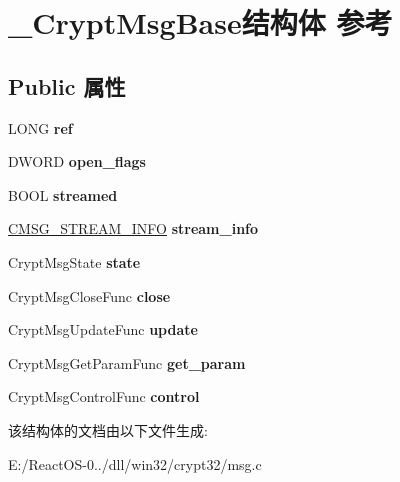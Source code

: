 \hypertarget{struct___crypt_msg_base}{}\section{\+\_\+\+Crypt\+Msg\+Base结构体 参考}
\label{struct___crypt_msg_base}
\subsection*{Public 属性}
\begin{DoxyCompactItemize}
\item 
\mbox{\label{struct___crypt_msg_base_a9ef50b71b8560a07428c10c747a4773d}} 
L\+O\+NG {\bfseries ref}
\item 
\mbox{\label{struct___crypt_msg_base_a504801162ea771fd24d28c3953c7ad0d}} 
D\+W\+O\+RD {\bfseries open\+\_\+flags}
\item 
\mbox{\label{struct___crypt_msg_base_ae7b6eb3c3d86d8cea5c2866d2ce30c54}} 
B\+O\+OL {\bfseries streamed}
\item 
\mbox{\label{struct___crypt_msg_base_a82082addd8fb4af039c94643dbd730a5}} 
\hyperlink{struct___c_m_s_g___s_t_r_e_a_m___i_n_f_o}{C\+M\+S\+G\+\_\+\+S\+T\+R\+E\+A\+M\+\_\+\+I\+N\+FO} {\bfseries stream\+\_\+info}
\item 
\mbox{\label{struct___crypt_msg_base_a71ffa37452ea6b9bc047c78123a5fc26}} 
Crypt\+Msg\+State {\bfseries state}
\item 
\mbox{\label{struct___crypt_msg_base_a94ada17daadbc2bd9564ee931619ccf5}} 
Crypt\+Msg\+Close\+Func {\bfseries close}
\item 
\mbox{\label{struct___crypt_msg_base_aa197c342ba9c04b4b8f5b549ba2fba60}} 
Crypt\+Msg\+Update\+Func {\bfseries update}
\item 
\mbox{\label{struct___crypt_msg_base_a6caa29d3a5c0c1095b5fcd6c3861ae76}} 
Crypt\+Msg\+Get\+Param\+Func {\bfseries get\+\_\+param}
\item 
\mbox{\label{struct___crypt_msg_base_a5abab403c4627f62559cc1e9710323a0}} 
Crypt\+Msg\+Control\+Func {\bfseries control}
\end{DoxyCompactItemize}


该结构体的文档由以下文件生成\+:\begin{DoxyCompactItemize}
\item 
E\+:/\+React\+O\+S-\/0../dll/win32/crypt32/msg.\+c\end{DoxyCompactItemize}
